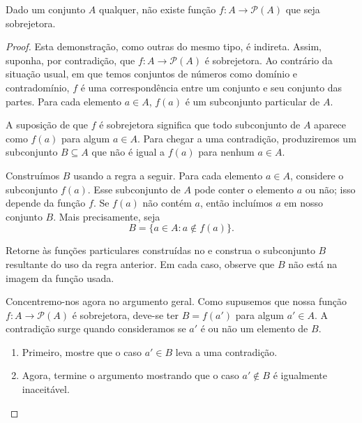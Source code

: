  
\begin{theorem}\label{thm:cantor}
Dado um conjunto $A$ qualquer, não existe função $f \colon A \to \mathcal{P}(A)$ que seja sobrejetora.  
\end{theorem}

\begin{proof}
Esta demonstração, como outras do mesmo tipo, é indireta. Assim, suponha, por contradição, que $f \colon A \to \mathcal{P}(A)$ é sobrejetora. Ao contrário da situação usual, em que temos conjuntos de números como domínio e contradomínio, $f$ é uma correspondência entre um conjunto e seu conjunto das partes. Para cada elemento $a \in A$, $f(a)$ é um subconjunto particular de $A$.

A suposição de que $f$ é sobrejetora significa que todo subconjunto de $A$ aparece como $f(a)$ para algum $a \in A$. Para chegar a uma contradição, produziremos um subconjunto $B \subseteq A$ que não é igual a $f(a)$ para nenhum $a \in A$.

Construímos $B$ usando a regra a seguir. Para cada elemento $a \in A$, considere o subconjunto $f(a)$. Esse subconjunto de $A$ pode conter o elemento $a$ ou não; isso depende da função $f$. Se $f(a)$ não contém $a$, então incluímos $a$ em nosso conjunto $B$. Mais precisamente, seja
\[
B = \{ a \in A : a \notin f(a) \}.
\]

\begin{exercise}\label{ex:conjunto-B-exemplo}
Retorne às funções particulares construídas no  e construa o subconjunto $B$ resultante do uso da regra anterior. Em cada caso, observe que $B$ não está na imagem da função usada.
\end{exercise}

Concentremo-nos agora no argumento geral. Como supusemos que nossa função $f \colon A \to \mathcal{P}(A)$ é sobrejetora, deve-se ter $B = f(a')$ para algum $a' \in A$. A contradição surge quando consideramos se $a'$ é ou não um elemento de $B$.

\begin{exercise}\label{ex:contradicao-B}
\begin{enumerate}[label=\alph*)]
\item Primeiro, mostre que o caso $a' \in B$ leva a uma contradição.
\item Agora, termine o argumento mostrando que o caso $a' \notin B$ é igualmente inaceitável.
\end{enumerate}
\end{exercise}
\end{proof}

